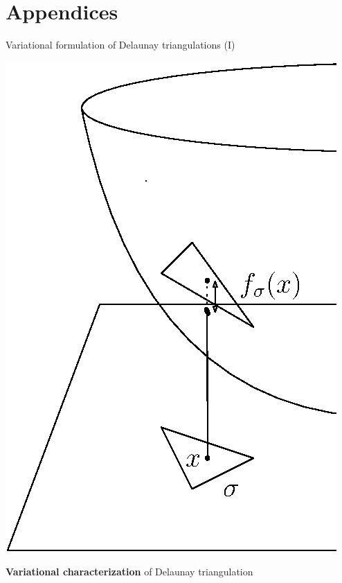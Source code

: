 \graphicspath{{images/appendices}}

\section*{Appendices}

\begin{frame}{Variational formulation of Delaunay triangulations (I)}
	\scriptsize 
	\begin{minipage}{0.3\linewidth}
		\centering
		\includegraphics[width=\linewidth]{height_difference}
	\end{minipage}%
	\hfill%
	\begin{minipage}{0.65\linewidth}
		\textbf{Variational characterization} of Delaunay triangulation \cite{musin_ConstructionVoronoiDiagram_2003, chen_OptimalDelaunayTriangulations_2004}
		

\end{minipage}
\end{frame}
